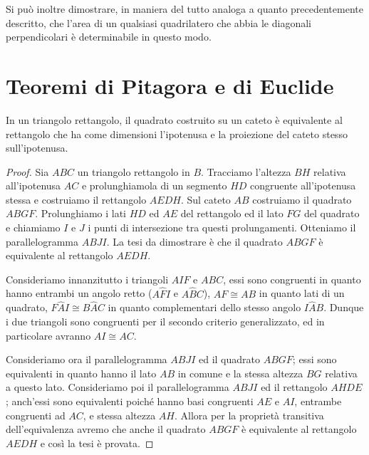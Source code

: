Si può inoltre dimostrare, in maniera del tutto analoga a quanto 
precedentemente descritto, che l'area di un qualsiasi quadrilatero 
che abbia le diagonali perpendicolari è determinabile in questo modo.


\section{Teoremi di Pitagora e di Euclide}
\label{sect:teoremi_pitagora_euclide}

\begin{teorema}
In un triangolo rettangolo, il quadrato costruito su un cateto è 
equivalente al rettangolo che ha come dimensioni l'ipotenusa e la 
proiezione del cateto stesso sull'ipotenusa.
\end{teorema}


\noindent\begin{minipage}{0.63\textwidth}\parindent15pt
\begin{proof}
Sia $ABC$ un triangolo rettangolo in $B$. Tracciamo l'altezza $BH$ 
relativa all'ipotenusa $AC$ e prolunghiamola di un segmento $HD$ 
congruente all'ipotenusa stessa e costruiamo il rettangolo $AEDH$. 
Sul cateto $AB$ costruiamo il quadrato $ABGF$. Prolunghiamo i lati 
$HD$ ed $AE$ del rettangolo ed il lato $FG$ del quadrato e chiamiamo 
$I$ e $J$ i punti di intersezione tra questi prolungamenti. Otteniamo 
il parallelogramma $ABJI$.
La tesi da dimostrare è che il quadrato $ABGF$ è equivalente al 
rettangolo $AEDH$.

Consideriamo innanzitutto i triangoli $AIF$ e $ABC$, essi sono 
congruenti in quanto hanno entrambi un angolo retto ($A\widehat{F}I$ 
e $A\widehat{B}C$), $AF\cong AB$ in quanto lati di un quadrato, 
$F\widehat{A}I\cong B\widehat{A}C$ in quanto complementari dello 
stesso angolo $I\widehat{A}B$.
Dunque i due triangoli sono congruenti per il secondo criterio 
generalizzato, ed in particolare avranno $AI\cong AC$.

Consideriamo ora il parallelogramma $ABJI$ ed il quadrato $ABGF$; 
essi sono equivalenti in quanto hanno il lato $AB$ in comune e la 
stessa altezza $BG$ relativa a questo lato. 
Consideriamo poi il parallelogramma $ABJI$ ed il rettangolo $AHDE$; 
anch'essi sono equivalenti poiché hanno basi congruenti $AE$ e $AI$, 
entrambe congruenti ad $AC$, e stessa altezza $AH$.
Allora per la proprietà transitiva dell'equivalenza avremo che anche 
il quadrato $ABGF$ è equivalente al rettangolo $AEDH$ e così la tesi 
è provata.
\end{proof}
\end{minipage}\hfil
\begin{minipage}{0.37\textwidth}
  \centering
\end{minipage}\vspace{8pt}


